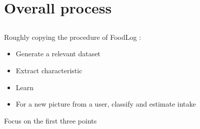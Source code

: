 \documentclass[aspectratio=169]{beamer}
\let\oldsection\section
\renewcommand{\section}[1]{
    \oldsection{#1}	
    \subsection{}
}
\newenvironment{myframe}[1][t]{\begin{frame}[#1]{\secname}{\subsecname}}{\end{frame}}
\begin{document}
     \section{Overall process}
     
     \begin{myframe}[c]
         Roughly copying the procedure of FoodLog \cite{Kitamura2009, Kitamura2008, DeSilva2011, Aizawa2013, Kagaya2014}:
         \begin{itemize}
             \item Generate a relevant dataset
             \item Extract characteristic
             \item Learn
             \item For a new picture from a user, classify and estimate intake
         \end{itemize}
         Focus on the first three points
     \end{myframe}
    
\end{document}
